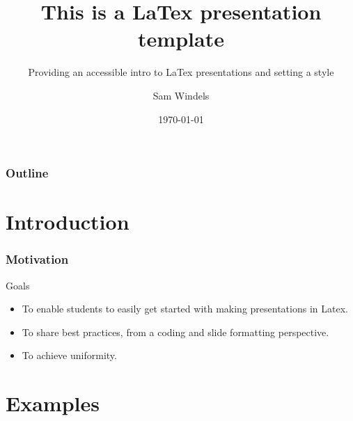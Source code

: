 \documentclass[aspectratio=169]{beamer} %
\title{This is a LaTex presentation template }
\subtitle{Providing an accessible intro to LaTex presentations and setting a style}
\author{Sam Windels}
\institute{Barcelona Supercomputing Centre}
\date{\today}
\begin{document}
{
\begin{frame}
  \titlepage
\end{frame}
}
\addtocounter{framenumber}{-1} %

\begin{frame}[c]
	\frametitle{Outline}
 	\tableofcontents
\end{frame}


\section{Introduction}	

\begin{frame}[c]
	\sectionpage
\end{frame}

\begin{frame}
\frametitle{Motivation}

\begin{block}{Goals}
	\begin{itemize}
		\item To enable students to easily get started with making presentations in Latex.
		\item To share best practices, from a coding and slide formatting perspective.
		\item To achieve uniformity.
	\end{itemize} 
\end{block}

\end{frame}


\section{Examples}	

\begin{frame}[c]
	\sectionpage
\end{frame}
\end{document}
